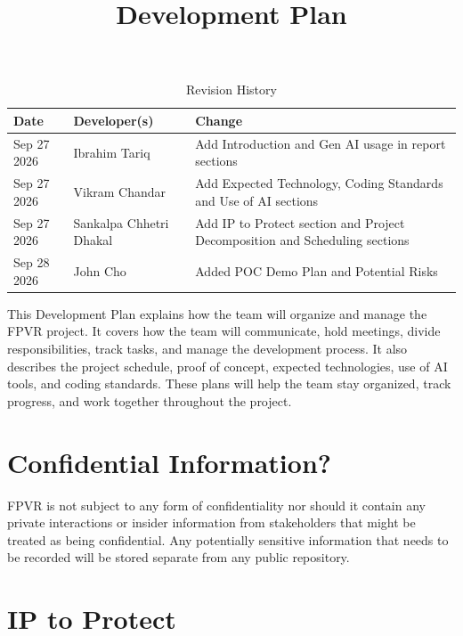 \documentclass{article}
\title{Development Plan\\\progname}
\author{\authname}
\date{}
\begin{document}
\maketitle

\begin{table}[hp]
\caption{Revision History} \label{TblRevisionHistory}
\begin{tabularx}{\textwidth}{llX}
\toprule
\textbf{Date} & \textbf{Developer(s)} & \textbf{Change}\\
\midrule
Sep 27 2026 & Ibrahim Tariq & Add Introduction and Gen AI usage in report sections\\
Sep 27 2026 & Vikram Chandar & Add Expected Technology, Coding Standards and Use of AI sections\\
Sep 27 2026 & Sankalpa Chhetri Dhakal & Add IP to Protect section and Project Decomposition and Scheduling sections\\
Sep 28 2026 & John Cho & Added POC Demo Plan and Potential Risks\\
\bottomrule
\end{tabularx}
\end{table}

\newpage{}

This Development Plan explains how the team will organize and manage the FPVR project. 
It covers how the team will communicate, hold meetings, divide responsibilities, track 
tasks, and manage the development process. It also describes the project schedule, proof
of concept, expected technologies, use of AI tools, and coding standards. These plans 
will help the team stay organized, track progress, and work together throughout the project.

\section{Confidential Information?}

FPVR is not subject to any form of confidentiality nor should it contain any private 
interactions or insider information from stakeholders that might be treated as 
being confidential. Any potentially sensitive information that needs to be recorded
will be stored separate from any public repository.
\section{IP to Protect}
\end{document}
